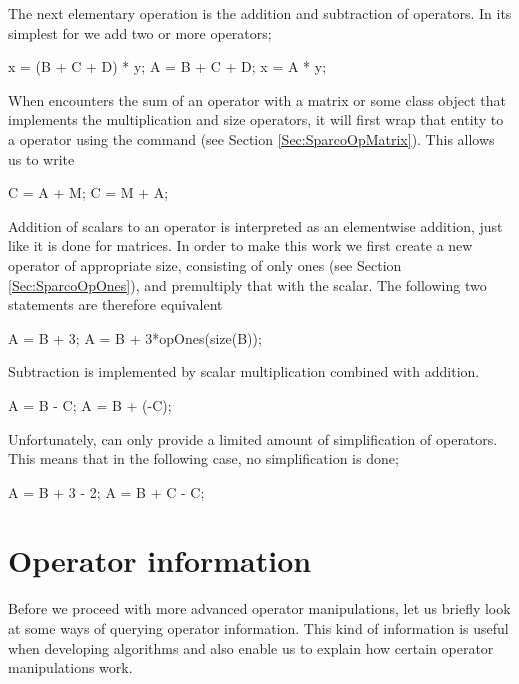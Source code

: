 The next elementary operation is the addition and subtraction of
operators. In its simplest for we add two or more operators;
\begin{codeblock}
x = (B + C + D) * y;
A = B + C + D;
x = A * y;           %
\end{codeblock}
When \sparco{} encounters the sum of an operator with a matrix or some
class object that implements the multiplication and size operators, it
will first wrap that entity to a \sparco{} operator using the
 command (see Section \ref{Sec:SparcoOpMatrix}). This
allows us to write
\begin{codeblock}
C = A + M;  %
C = M + A;  %
\end{codeblock}
Addition of scalars to an operator is interpreted as an elementwise
addition, just like it is done for matrices. In order to make this
work we first create a new operator of appropriate size, consisting of
only ones (see Section \ref{Sec:SparcoOpOnes}), and premultiply that
with the scalar. The following two statements are therefore equivalent
\begin{codeblock}
A = B + 3;
A = B + 3*opOnes(size(B));
\end{codeblock}
Subtraction is implemented by scalar multiplication combined with
addition.
\begin{codeblock}
A = B - C;
A = B + (-C);
\end{codeblock}
Unfortunately, \sparco{} can only provide a limited amount of
simplification of operators. This means that in the following case, no
simplification is done;
\begin{codeblock}
A = B + 3 - 2; %
A = B + C - C; %
\end{codeblock}


\section{Operator information}\label{Sec:SparcoDisp}
\label{Sec:SparcoIsReal}

Before we proceed with more advanced operator manipulations, let us
briefly look at some ways of querying operator information. This kind
of information is useful when developing algorithms and also enable us
to explain how certain operator manipulations work.


